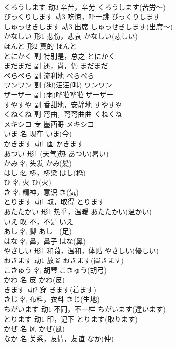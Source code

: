 \documentclass[8pt]{extreport}
\begin{document}
\begin{CJK}{UTF8}{min}
\\	くろうします	动3	辛苦，辛劳	くろうします(苦労～)	
\\	びっくりします	动3	吃惊，吓一跳	びっくりします	
\\	しゅっせきします	动3	出席	しゅっせきします(出席～)	
\\	かなしい	形1	悲伤，悲哀	かなしい(悲しい)	
\\	ほんと	形2	真的	ほんと	
\\	とにかく	副	特别是，总之	とにかく	
\\	まだまだ	副	还，尚，仍	まだまだ	
\\	ぺらぺら	副	流利地	ぺらぺら	
\\	ワンワン	副	(狗)汪汪(叫)	ワンワン	
\\	ザーザー	副	(雨)哗啦哗啦	ザーザー	
\\	すやすや	副	香甜地，安静地	すやすや	
\\	くねくね	副	弯曲，弯弯曲曲	くねくね	
\\	メキシコ	专	墨西哥	メキシコ	
\\	いま	名	现在	いま(今)	
\\	かきます	动1	画	かきます	
\\	あつい	形1	(天气)热	あつい(暑い)	
\\	かみ	名	头发	かみ(髪)	
\\	はし	名	桥，桥梁	はし(橋)	
\\	ひ	名	火	ひ(火)	
\\	き	名	精神，意识	き(気)	
\\	とります	动1	取，取得	とります	
\\	あたたかい	形1	热乎，温暖	あたたかい(温かい)	
\\	いえ	叹	不，不是	いえ	
\\	あし	名	脚	あし　(足)	
\\	はな	名	鼻，鼻子	はな(鼻)	
\\	やさしい	形1	和蔼，温和，体贴	やさしい(優しい)	
\\	おきます	动1	放置	おきます(置きます)	
\\	こきゅう	名	胡琴	こきゅう(胡弓)	
\\	かわ	名	皮	かわ(皮)	
\\	きます	动2	穿	きます(着ます)	
\\	きじ	名	布料，衣料	きじ(生地)	
\\	ちがいます	动1	不同，不一样	ちがいます(違います)	
\\	とります	动1	印，记下	とります(取ります)	
\\	かぜ	名	风	かぜ(風)	
\\	なか	名	关系，友情，友谊	なか(仲)	

\end{CJK}
\end{document}
